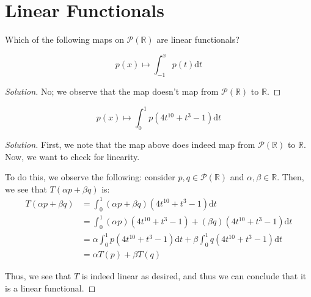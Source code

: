 \documentclass{article}
\newenvironment{solution}{\begin{proof}[Solution]}{\end{proof}}
\newcommand{\RR}{\mathbb{R}}
\begin{document}
	\newpage
	
	\section{Linear Functionals}
	Which of the following maps on $\mathscr{P}(\RR)$ are linear functionals?
	\begin{hw}
		\begin{equation*}
			p(x) \mapsto \int_{-1}^{x} p(t) \mathrm dt
		\end{equation*}
	\end{hw}
	\begin{solution}
		No; we observe that the map doesn't map from $\mathscr{P}(\RR)$ to $\RR$.
		\begin{comment}
			\begin{align*}
			\int_{-1}^{x} p(t)\mathrm dt &= P(t) \big|_{-1}^{x} \\
			&= P(x) - P(-1)
		\end{align*}
	
		We see that $P(x) - P(-1)$ doesn't evaluate to a real number. Thus, the map isn't a linear functional.
		\end{comment}
	\end{solution}

	\begin{hw}
		\begin{equation*}
			p(x) \mapsto \int_0^{1} p(4t^{10} + t^{3} - 1) \mathrm dt
		\end{equation*}
	\end{hw}
	\begin{solution}
		First, we note that the map above does indeed map from $\mathscr{P}(\RR)$ to $\RR$. Now, we want to check for linearity.
		
		To do this, we observe the following: consider $p,q \in \mathscr{P}(\RR)$ and $\alpha, \beta \in \RR$. Then, we see that $T(\alpha p+\beta q)$ is:
		\begin{align*}
			T(\alpha p+\beta q) &= \int_0^{1} (\alpha p+\beta q)(4t^{10} + t^{3} - 1) \mathrm dt \\
			&= \int_0^{1} (\alpha p)(4t^{10} + t^{3} - 1) + (\beta q)(4t^{10} + t^{3} - 1) \mathrm dt \\
			&= \alpha\int_0^{1} p(4t^{10} + t^{3} - 1) \mathrm dt + \beta\int_0^{1} q(4t^{10} + t^{3} - 1) \mathrm dt \\
			&= \alpha T(p) +\beta T(q)
		\end{align*}
	
		Thus, we see that $T$ is indeed linear as desired, and thus we can conclude that it is a linear functional.
	\end{solution}
\end{document}
